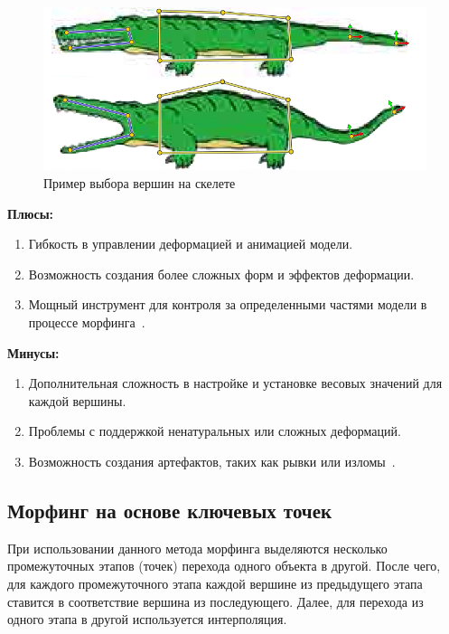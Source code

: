 \begin{figure}[H]
	\centering
	\includegraphics{images/weight_points_chosen.png}
	\caption{Пример выбора вершин на скелете}
	\label{fig:weight_points_chosen}
\end{figure}

\textbf{Плюсы:}
\begin{enumerate}
	\item Гибкость в управлении деформацией и анимацией модели.
	\item Возможность создания более сложных форм и эффектов деформации.
	\item Мощный инструмент для контроля за определенными частями модели в процессе морфинга~\cite{morphing_methods}.
\end{enumerate}

\textbf{Минусы:}
\begin{enumerate}
	\item Дополнительная сложность в настройке и установке весовых значений для каждой вершины.
	\item Проблемы с поддержкой ненатуральных или сложных деформаций.
	\item Возможность создания артефактов, таких как рывки или изломы~\cite{morphing_methods}.
\end{enumerate}

\subsection{Морфинг на основе ключевых точек}
При использовании данного метода морфинга выделяются несколько промежуточных этапов (точек) перехода одного объекта в другой. После чего, для каждого промежуточного этапа каждой вершине из предыдущего этапа ставится в соответствие вершина из последующего. 
Далее, для перехода из одного этапа в другой используется интерполяция.


